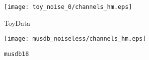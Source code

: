 \begin{subfigure}{0.35\textwidth}
    \texttt{[image: toy\_noise\_0/channels\_hm.eps]}%
    \caption{ToyData}%
    \label{fig:noiseless_channels_toy}%
\end{subfigure}
\begin{subfigure}{0.35\textwidth}
    \texttt{[image: musdb\_noiseless/channels\_hm.eps]}%
    \caption{\texttt{musdb18}}%
    \label{fig:noiseless_channels_musdb}%
\end{subfigure}
